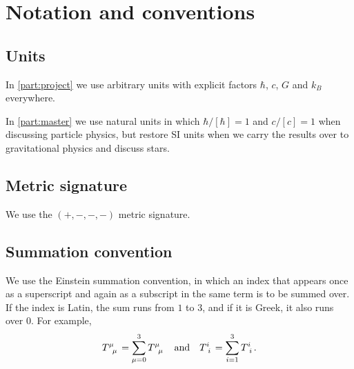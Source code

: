 \chapter{Notation and conventions} %

\section*{Units}

In \cref{part:project} we use arbitrary units with explicit factors $\hbar$, $c$, $G$ and $k_B$ everywhere.

In \cref{part:master} we use natural units in which $\hbar / [\hbar] = 1$ and $c / [c] = 1$ when discussing particle physics,
but restore SI units when we carry the results over to gravitational physics and discuss stars.

\section*{Metric signature}

We use the $(+,-,-,-)$ metric signature.

\section*{Summation convention}

We use the Einstein summation convention, in which an index that appears once as a superscript and again as a subscript in the same term is to be summed over.
If the index is Latin, the sum runs from $1$ to $3$, and if it is Greek, it also runs over $0$.
For example,
\begin{equation*}
	T\indices{^\mu_\mu} = \sum_{\mu=0}^3 T\indices{^\mu_\mu}
	\quad \text{and} \quad
	T\indices{^i_i} = \sum_{i=1}^3 T\indices{^i_i}
	.
\end{equation*}

\iffalse
\section*{Fourier transformation}

We use the Fourier transformation convention
\begin{equation}
	f(k) = \int \dif x \, e^{i k x} f(x)
	\qquad \text{and} \qquad
	f(x) = \int \frac{\dif k}{2 \pi} \, e^{-i k x} f(k) .
\end{equation}
With this convention, the delta function $\delta(x' - x)$ is given by the highlighted part of
\begin{equation}
	f(x) = \int \frac{\dif k}{2 \pi} \, e^{-i k x} f(k)
	     = \int \dif x' \underbrace{\int \frac{\dif k}{2 \pi} \, e^{i k (x'-x)}}_{\displaystyle \delta(x'-x)} f(k) .
\label{eq:pre:delta_function}
\end{equation}
\fi
